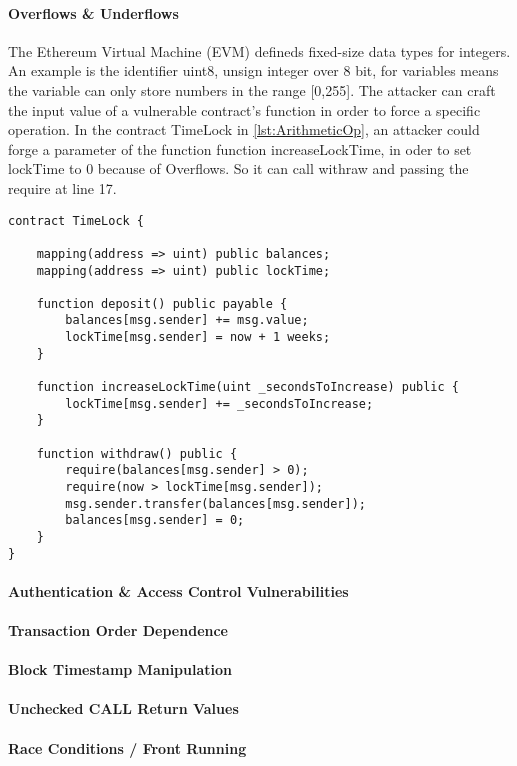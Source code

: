 \documentclass[a4paper,sigconf, language=french,
language=german, language=spanish, language=english]{acmart}
\begin{document}
\paragraph{Overflows \& Underflows} The Ethereum Virtual Machine (EVM) defineds fixed-size data types for integers. 
An example is the identifier uint8, unsign integer over 8 bit, for variables means the variable can only store numbers in the range [0,255].
The attacker can craft the input value of a vulnerable contract's function in order to force a specific operation. 
In the contract TimeLock in \autoref{lst:ArithmeticOp}, an attacker could forge a parameter of the function function increaseLockTime, 
in oder to set lockTime to 0 because of Overflows. So it can call withraw and passing the require at line 17.
\begin{lstlisting}[language=Solidity,caption={Overflows \& Underflows},label={lst:ArithmeticOp}]
contract TimeLock {
  
    mapping(address => uint) public balances;
    mapping(address => uint) public lockTime;
    
    function deposit() public payable {
        balances[msg.sender] += msg.value;
        lockTime[msg.sender] = now + 1 weeks;
    }
    
    function increaseLockTime(uint _secondsToIncrease) public {
        lockTime[msg.sender] += _secondsToIncrease;
    }
    
    function withdraw() public {
        require(balances[msg.sender] > 0);
        require(now > lockTime[msg.sender]);
        msg.sender.transfer(balances[msg.sender]);
        balances[msg.sender] = 0;
    }
}
\end{lstlisting}
\paragraph{Authentication \& Access Control Vulnerabilities} 
\paragraph{Transaction Order Dependence}
\paragraph{Block Timestamp Manipulation}
\paragraph{Unchecked CALL Return Values}
\paragraph{Race Conditions / Front Running}
\end{document}
